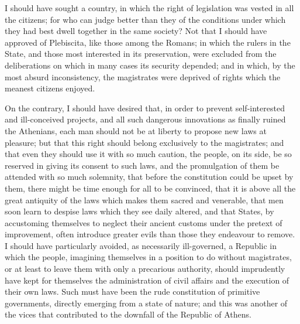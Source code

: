 \documentclass[12pt]{report}
\begin{document}
I should have sought a country, in which the right of legislation was vested in all the citizens; for who can judge better than they of the conditions under which they had best dwell together in the same society? Not that I should have approved of Plebiscita, like those among the Romans; in which the rulers in the State, and those most interested in its preservation, were excluded from the deliberations on which in many cases its security depended; and in which, by the most absurd inconsistency, the magistrates were deprived of rights which the meanest citizens enjoyed.

On the contrary, I should have desired that, in order to prevent self-interested and ill-conceived projects, and all such dangerous innovations as finally ruined the Athenians, each man should not be at liberty to propose new laws at pleasure; but that this right should belong exclusively to the magistrates; and that even they should use it with so much caution, the people, on its side, be so reserved in giving its consent to such laws, and the promulgation of them be attended with so much solemnity, that before the constitution could be upset by them, there might be time enough for all to be convinced, that it is above all the great antiquity of the laws which makes them sacred and venerable, that men soon learn to despise laws which they see daily altered, and that States, by accustoming themselves to neglect their ancient customs under the pretext of improvement, often introduce greater evils than those they endeavour to remove.
\clearpage
I should have particularly avoided, as necessarily ill-governed, a Republic in which the people, imagining themselves in a position to do without magistrates, or at least to leave them with only a precarious authority, should imprudently have kept for themselves the administration of civil affairs and the execution of their own laws. Such must have been the rude constitution of primitive governments, directly emerging from a state of nature; and this was another of the vices that contributed to the downfall of the Republic of Athens.
\end{document}
